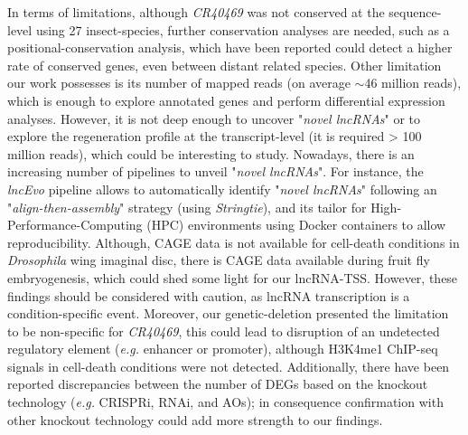 In terms of limitations, although \textit{CR40469} was not conserved at the sequence-level using 27 insect-species, further conservation analyses are needed, such as a positional-conservation analysis, which have been reported could detect a higher rate of conserved genes,\autocite{ulitsky_2016_evolution} even between distant related species. Other limitation our work possesses is its number of mapped reads (on average $\sim$46 million reads), which is enough to explore annotated genes and perform differential expression analyses.\autocite{sims_2014_sequencing} However, it is not deep enough to uncover "\textit{novel lncRNAs}" or to explore the regeneration profile at the transcript-level (it is required > 100 million reads\autocite{zhao_2011_optimizing}), which could be interesting to study. Nowadays, there is an increasing number of pipelines to unveil "\textit{novel lncRNAs}". For instance, the \textit{lncEvo} pipeline\autocite{bryzghalov_2021_lncevo} allows to automatically identify "\textit{novel lncRNAs}" following an "\textit{align-then-assembly}" strategy (using \textit{Stringtie}), and its tailor for High-Performance-Computing (HPC) environments using Docker containers to allow reproducibility. Although, CAGE data is not available for cell-death conditions in \textit{Drosophila} wing imaginal disc, there is CAGE data available during fruit fly embryogenesis,\autocite{schor_2018} which could shed some light for our lncRNA-TSS. However, these findings should be considered with caution, as lncRNA transcription is a condition-specific event. Moreover, our genetic-deletion presented the limitation to be non-specific for \textit{CR40469}, this could lead to disruption of an undetected regulatory element (\textit{e.g.} enhancer or promoter), although H3K4me1 ChIP-seq signals in cell-death conditions were not detected.  Additionally, there have been reported discrepancies between the number of DEGs based on the knockout technology (\textit{e.g.} CRISPRi, RNAi, and AOs); in consequence confirmation with other knockout technology could add more strength to our findings. 

